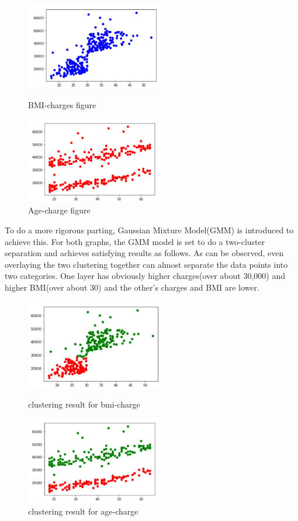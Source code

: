\documentclass[12pt,a4paper]{article}
\begin{document}
\begin{figure}[H]
\centering
\begin{minipage}[t]{0.48\textwidth}
\centering
\includegraphics[width=6cm]{bmi-charge smoker.jpg}
\caption{BMI-charges figure}
\end{minipage}
\begin{minipage}[t]{0.48\textwidth}
\centering
\includegraphics[width=6cm]{age-chargesmoker.jpg}
\caption{Age-charge figure}
\end{minipage}
\end{figure}


To do a more rigorous parting, Gaussian Mixture Model(GMM) is introduced to achieve this. For both graphs, the GMM model is set to do a two-cluster separation and achieves satisfying results as follows. As can be observed, even overlaying the two clustering together can almost separate the data points into two categories. One layer has obviously higher charges(over about 30,000) and higher BMI(over about 30) and the other's charges and BMI are lower.


\begin{figure}[H]
\centering
\begin{minipage}[t]{0.48\textwidth}
\centering
\includegraphics[width=6cm]{cluster result for bmi-charge.jpg}
\caption{clustering result for bmi-charge}
\end{minipage}
\begin{minipage}[t]{0.48\textwidth}
\centering
\includegraphics[width=6cm]{clustering result for age-charge.jpg}
\caption{clustering result for age-charge}
\end{minipage}
\end{figure}
\end{document}
